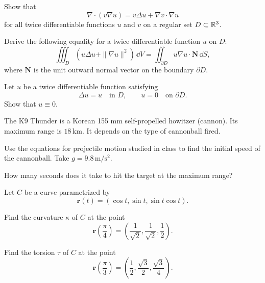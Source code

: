 \begin{problem}
\begin{problemsubparts}
\item Show that
\[
\nabla\cdot(v\nabla u)=v\Delta u+\nabla v\cdot\nabla u
\]
for all twice differentiable functions $u$ and $v$ on a regular set $D\subset\mathbb{R}^3$.
\item Derive the following equality for a twice differentiable function $u$ on $D$:
\[
\iiint_D\left(u\Delta u+\|\nabla u\|^2\right)\,\dd V
=
\iint_{\partial D}u\nabla u\cdot\mathbf N\,\dd S,
\]
where $\mathbf N$ is the unit outward normal vector on the boundary $\partial D$.
\item Let $u$ be a twice differentiable function satisfying
\[
\Delta u=u\quad\text{in }D,
\qquad
u=0\quad\text{on }\partial D.
\]
Show that $u\equiv0$.
\end{problemsubparts}
\end{problem}

\begin{problem}
The K9 Thunder is a Korean 155 mm self-propelled howitzer (cannon). Its maximum range is $18\,\mathrm{km}$. It depends on the type of cannonball fired.
\begin{problemsubparts}
\item Use the equations for projectile motion studied in class to find the initial speed of the cannonball. Take $g=9.8\,\mathrm{m/s^2}$.
\item How many seconds does it take to hit the target at the maximum range?
\end{problemsubparts}
\end{problem}

\begin{problem}
Let $C$ be a curve parametrized by
\[
\mathbf r(t)=(\cos t,\sin t,\sin t\cos t).
\]
\begin{problemsubparts}
\item Find the curvature $\kappa$ of $C$ at the point
\[
\mathbf r\!\left(\frac{\pi}{4}\right)
=\left(\frac{1}{\sqrt2},\frac{1}{\sqrt2},\frac12\right).
\]
\item Find the torsion $\tau$ of $C$ at the point
\[
\mathbf r\!\left(\frac{\pi}{3}\right)
=\left(\frac12,\frac{\sqrt3}{2},\frac{\sqrt3}{4}\right).
\]
\end{problemsubparts}
\end{problem}

